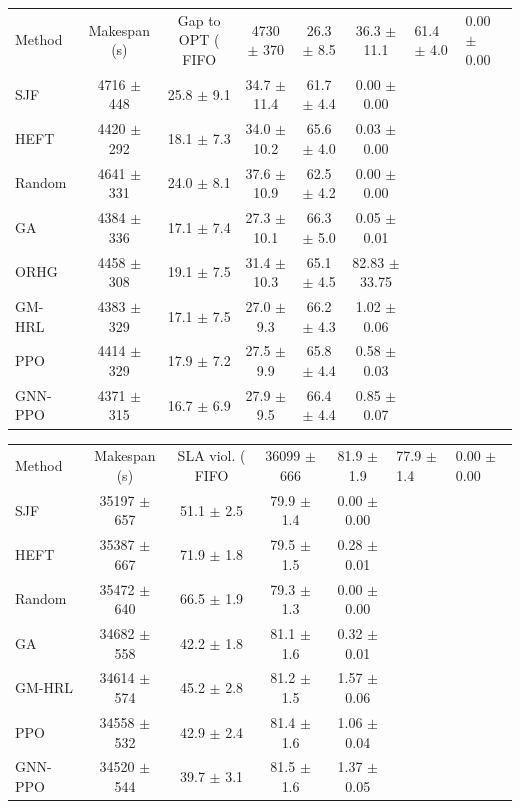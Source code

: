 \begin{tabular}{lccccc}
\toprule
Method & Makespan (s) & Gap to OPT (%
\midrule
FIFO & 4730 $\pm$ 370 & 26.3 $\pm$ 8.5 & 36.3 $\pm$ 11.1 & 61.4 $\pm$ 4.0 & 0.00 $\pm$ 0.00 \\
SJF & 4716 $\pm$ 448 & 25.8 $\pm$ 9.1 & 34.7 $\pm$ 11.4 & 61.7 $\pm$ 4.4 & 0.00 $\pm$ 0.00 \\
HEFT & 4420 $\pm$ 292 & 18.1 $\pm$ 7.3 & 34.0 $\pm$ 10.2 & 65.6 $\pm$ 4.0 & 0.03 $\pm$ 0.00 \\
Random & 4641 $\pm$ 331 & 24.0 $\pm$ 8.1 & 37.6 $\pm$ 10.9 & 62.5 $\pm$ 4.2 & 0.00 $\pm$ 0.00 \\
GA & 4384 $\pm$ 336 & 17.1 $\pm$ 7.4 & 27.3 $\pm$ 10.1 & 66.3 $\pm$ 5.0 & 0.05 $\pm$ 0.01 \\
ORHG & 4458 $\pm$ 308 & 19.1 $\pm$ 7.5 & 31.4 $\pm$ 10.3 & 65.1 $\pm$ 4.5 & 82.83 $\pm$ 33.75 \\
GM-HRL & 4383 $\pm$ 329 & 17.1 $\pm$ 7.5 & 27.0 $\pm$ 9.3 & 66.2 $\pm$ 4.3 & 1.02 $\pm$ 0.06 \\
PPO & 4414 $\pm$ 329 & 17.9 $\pm$ 7.2 & 27.5 $\pm$ 9.9 & 65.8 $\pm$ 4.4 & 0.58 $\pm$ 0.03 \\
GNN-PPO & 4371 $\pm$ 315 & 16.7 $\pm$ 6.9 & 27.9 $\pm$ 9.5 & 66.4 $\pm$ 4.4 & 0.85 $\pm$ 0.07 \\
\bottomrule
\end{tabular}

\begin{tabular}{lcccc}
\toprule
Method & Makespan (s) & SLA viol. (%
\midrule
FIFO & 36099 $\pm$ 666 & 81.9 $\pm$ 1.9 & 77.9 $\pm$ 1.4 & 0.00 $\pm$ 0.00 \\
SJF & 35197 $\pm$ 657 & 51.1 $\pm$ 2.5 & 79.9 $\pm$ 1.4 & 0.00 $\pm$ 0.00 \\
HEFT & 35387 $\pm$ 667 & 71.9 $\pm$ 1.8 & 79.5 $\pm$ 1.5 & 0.28 $\pm$ 0.01 \\
Random & 35472 $\pm$ 640 & 66.5 $\pm$ 1.9 & 79.3 $\pm$ 1.3 & 0.00 $\pm$ 0.00 \\
GA & 34682 $\pm$ 558 & 42.2 $\pm$ 1.8 & 81.1 $\pm$ 1.6 & 0.32 $\pm$ 0.01 \\
GM-HRL & 34614 $\pm$ 574 & 45.2 $\pm$ 2.8 & 81.2 $\pm$ 1.5 & 1.57 $\pm$ 0.06 \\
PPO & 34558 $\pm$ 532 & 42.9 $\pm$ 2.4 & 81.4 $\pm$ 1.6 & 1.06 $\pm$ 0.04 \\
GNN-PPO & 34520 $\pm$ 544 & 39.7 $\pm$ 3.1 & 81.5 $\pm$ 1.6 & 1.37 $\pm$ 0.05 \\
\bottomrule
\end{tabular}

